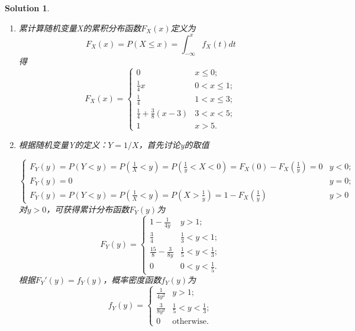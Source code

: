 \documentclass[a4paper,UTF8]{article}
\numberwithin{equation}{section}
\newtheorem*{mySol}{Solution}
\begin{document}
\begin{mySol}
\begin{enumerate}[ {(}1{)}]

\item 累计算随机变量X的累积分布函数$F_X(x)$定义为 
\begin{equation}
F_X(x) = P(X \leq x) = \int_{-\infty}^{x} f_X(t) dt 
\end{equation}
得
\begin{equation}
	F_X(x) = 
	\begin{cases}
		0 & x \leq 0;\\
		\frac{1}{4}x & 0<x\leq1;\\
		\frac{1}{4} &1<x\leq 3;\\
		\frac{1}{4}+\frac{3}{8}(x-3) & 3<x<5; \\
		1 & x>5.
	\end{cases}
\end{equation}

\item 根据随机变量Y的定义：$Y = 1/X$，首先讨论y的取值

\begin{equation}
	\begin{cases}
		F_Y(y) = P(Y<y) = P(\frac{1}{X} < y) = P(\frac{1}{y} < X<0) = F_X(0) - F_X(\frac{1}{y}) = 0 & y<0;\\
		F_Y(y) = 0 & y=0;\\
		F_Y(y) = P(Y<y) = P(\frac{1}{X} < y) = P(X> \frac{1}{y} )  = 1-	F_X(\frac{1}{y})		& y>0
	\end{cases}
\end{equation}
对$y>0$，可获得累计分布函数$F_Y(y)$为
\begin{equation}
	F_Y(y) = 
	\begin{cases}
		1- \frac{1}{4y} & y>1;\\
		\frac{3}{4} & \frac{1}{3}<y <1;\\
		\frac{15}{8}-\frac{3}{8y} & \frac{1}{5}<y<\frac{1}{3};\\
		0			& 0 <y<\frac{1}{5}.
	\end{cases}
\end{equation}
根据$F_Y'(y) = f_Y(y)$，概率密度函数$f_Y(y)$为
\begin{equation}
	f_Y(y) = 
	\begin{cases}
		\frac{1}{4y^2} & y>1;\\
		\frac{3}{8y^2} & \frac{1}{5}<y<\frac{1}{3};\\
		0			& \mbox{otherwise.}
	\end{cases}
\end{equation}


\end{enumerate}
\end{mySol}
\end{document}
